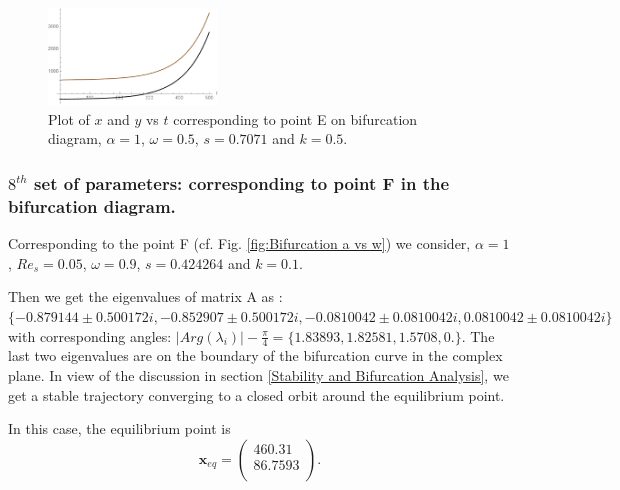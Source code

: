 \documentclass[pdflatex,sn-mathphys]{sn-jnl}%
\theoremstyle{thmstyleone}%
\theoremstyle{thmstyletwo}%
\theoremstyle{thmstylethree}%
\begin{document}
\begin{figure}[h]%
\centering
    \includegraphics[width=0.4\textwidth]{Unstable_ais1Plot}
    \caption{Plot of $x$ and $y$ vs $t$ corresponding to point E on bifurcation diagram, $\alpha = 1$, $\omega=0.5$, $s=0.7071$ and $k=0.5$.}
    \label{fig:Unstable  Point E}
\end{figure}

\subsubsection{$8^{th}$ set of parameters: corresponding to point F in the bifurcation diagram.}\label{$8{th}$ set}
Corresponding to the point F (cf. Fig. \ref{fig:Bifurcation a vs w}) we consider,	$\alpha = 1$, $Re_{s}=0.05$, $\omega=0.9$, $s=0.424264$ and $k=0.1$.

Then we get the eigenvalues of matrix A as : $\{-0.879144 \pm 0.500172 i,-0.852907 \pm0.500172 i,-0.0810042 \pm 0.0810042 i,0.0810042 \pm 0.0810042 i\}$
with corresponding angles:  $\vert Arg(\lambda_{i})\vert - \frac{\pi}{4}= \{1.83893,1.82581,1.5708,0.\}$. The last two eigenvalues are on the boundary of the bifurcation curve in the complex plane.  In view of the discussion in section \ref{Stability and Bifurcation Analysis}, we get a stable trajectory converging to a closed orbit around the equilibrium point.

In this case, the equilibrium point is $$\mathbf{x}_{eq}=
\left(
\begin{array}{c}
 460.31 \\
86.7593\\
\end{array}
\right).$$
\end{document}
